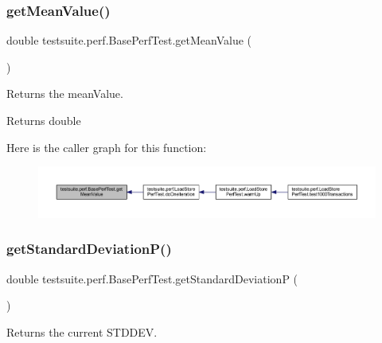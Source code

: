 \subsubsection{\texorpdfstring{get\+Mean\+Value()}{getMeanValue()}}
{\footnotesize\ttfamily double testsuite.\+perf.\+Base\+Perf\+Test.\+get\+Mean\+Value (\begin{DoxyParamCaption}{ }\end{DoxyParamCaption})}

Returns the mean\+Value.

\begin{DoxyReturn}{Returns}
double 
\end{DoxyReturn}
Here is the caller graph for this function\+:
\nopagebreak
\begin{figure}[H]
\begin{center}
\leavevmode
\includegraphics[width=350pt]{classtestsuite_1_1perf_1_1_base_perf_test_a27382fb187f93da07deaa8b4ce1cc3e9_icgraph}
\end{center}
\end{figure}
\mbox{\label{classtestsuite_1_1perf_1_1_base_perf_test_a72145770043104a1fe0a8a1648044aed}} 
\subsubsection{\texorpdfstring{get\+Standard\+Deviation\+P()}{getStandardDeviationP()}}
{\footnotesize\ttfamily double testsuite.\+perf.\+Base\+Perf\+Test.\+get\+Standard\+DeviationP (\begin{DoxyParamCaption}{ }\end{DoxyParamCaption})\hspace{0.3cm}{\ttfamily [protected]}}

Returns the current S\+T\+D\+D\+EV.

